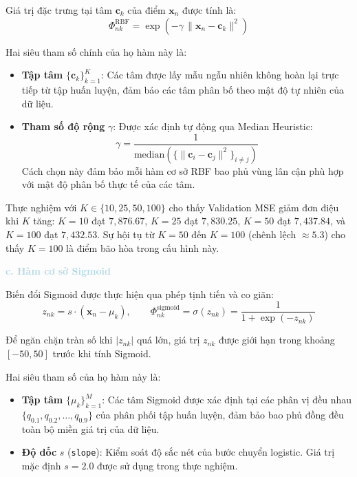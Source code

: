 Giá trị đặc trưng tại tâm $\boldsymbol{c}_k$ của điểm $\boldsymbol{x}_n$
được tính là:
$$\Phi_{nk}^{\mathrm{RBF}}
  = \exp\!\left(-\gamma\,\|\boldsymbol{x}_n - \boldsymbol{c}_k\|^2\right)$$

Hai siêu tham số chính của họ hàm này là:
\begin{itemize} [labelsep=10pt, leftmargin=2cm]
    \item \textbf{Tập tâm} $\{\boldsymbol{c}_k\}_{k=1}^{K}$: Các tâm được
    lấy mẫu ngẫu nhiên không hoàn lại trực tiếp từ tập huấn luyện, đảm
    bảo các tâm phân bố theo mật độ tự nhiên của dữ liệu.
    \item \textbf{Tham số độ rộng} $\gamma$: Được xác định tự động qua
    Median Heuristic:
    $$\gamma = \frac{1}{\mathrm{median}\!\left(\{\|\boldsymbol{c}_i
      - \boldsymbol{c}_j\|^2\}_{i \neq j}\right)}$$
    Cách chọn này đảm bảo mỗi hàm cơ sở RBF bao phủ vùng lân cận phù hợp
    với mật độ phân bố thực tế của các tâm.
\end{itemize}

Thực nghiệm với $K \in \{10, 25, 50, 100\}$ cho thấy Validation MSE giảm
đơn điệu khi $K$ tăng: $K=10$ đạt $7{,}876.67$, $K=25$ đạt $7{,}830.25$,
$K=50$ đạt $7{,}437.84$, và $K=100$ đạt $7{,}432.53$. Sự hội tụ từ
$K=50$ đến $K=100$ (chênh lệch $\approx 5.3$) cho thấy $K=100$ là
điểm bão hòa trong cấu hình này.

\noindent\textcolor{lightblue}{\textbf{c. Hàm cơ sở Sigmoid}}

Biến đổi Sigmoid được thực hiện qua phép tịnh tiến và co giãn:
$$z_{nk} = s \cdot (\boldsymbol{x}_n - \mu_k), \qquad
  \Phi_{nk}^{\mathrm{sigmoid}} = \sigma(z_{nk})
  = \frac{1}{1 + \exp(-z_{nk})}$$

Để ngăn chặn tràn số khi $|z_{nk}|$ quá lớn, giá trị $z_{nk}$ được
giới hạn trong khoảng $[-50, 50]$ trước khi tính Sigmoid.

Hai siêu tham số của họ hàm này là:
\begin{itemize} [labelsep=10pt, leftmargin=2cm]
    \item \textbf{Tập tâm} $\{\mu_k\}_{k=1}^{M}$: Các tâm Sigmoid được
    xác định tại các phân vị đều nhau $\{q_{0.1}, q_{0.2}, \ldots, q_{0.9}\}$
    của phân phối tập huấn luyện, đảm bảo bao phủ đồng đều toàn bộ miền
    giá trị của dữ liệu.
    \item \textbf{Độ dốc} $s$ (\texttt{slope}): Kiểm soát độ sắc nét của
    bước chuyển logistic. Giá trị mặc định $s = 2.0$ được sử dụng trong
    thực nghiệm.
\end{itemize}

